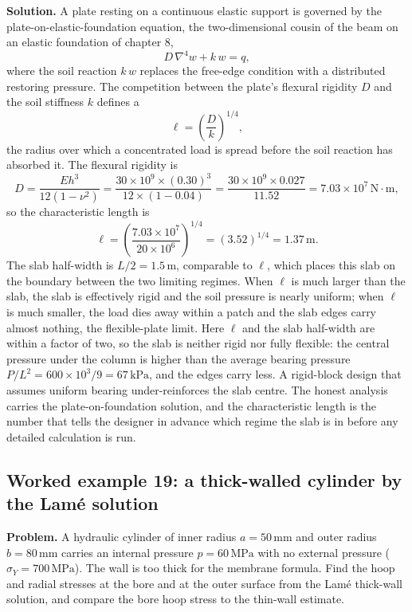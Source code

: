 \textbf{Solution.} A plate resting on a continuous elastic support is
governed by the plate-on-elastic-foundation equation, the
two-dimensional cousin of the beam on an elastic foundation of chapter 8,
\[
D\,\nabla^4 w + k\, w = q,
\]
where the soil reaction $k\,w$ replaces the free-edge condition with a
distributed restoring pressure. The competition between the plate's
flexural rigidity $D$ and the soil stiffness $k$ defines a
\[
\ell = \left(\frac{D}{k}\right)^{1/4},
\]
the radius over which a concentrated load is spread before the soil
reaction has absorbed it. The flexural rigidity is
\[
D = \frac{E h^3}{12(1-\nu^2)}
= \frac{30\times 10^9 \times (0.30)^3}{12\times (1-0.04)}
= \frac{30\times 10^9 \times 0.027}{11.52}
= 7.03\times 10^{7}\,\text{N}\cdot\text{m},
\]
so the characteristic length is
\[
\ell = \left(\frac{7.03\times 10^7}{20\times 10^6}\right)^{1/4}
= (3.52)^{1/4} = 1.37\,\si{\meter}.
\]
The slab half-width is $L/2 = 1.5\,\si{\meter}$, comparable to $\ell$,
which places this slab on the boundary between the two limiting regimes.
When $\ell$ is much larger than the slab, the slab is effectively rigid
and the soil pressure is nearly uniform; when $\ell$ is much smaller, the
load dies away within a patch and the slab edges carry almost nothing, the
flexible-plate limit. Here $\ell$ and the slab half-width are within a
factor of two, so the slab is neither rigid nor fully flexible: the
central pressure under the column is higher than the average bearing
pressure $P/L^2 = 600\times 10^3/9 = 67\,\text{kPa}$, and the edges carry
less. A rigid-block design that assumes uniform bearing under-reinforces
the slab centre. The honest analysis carries the plate-on-foundation
solution, and the characteristic length is the number that tells the
designer in advance which regime the slab is in before any detailed
calculation is run.

\subsection*{Worked example 19: a thick-walled cylinder by the Lam\'e solution}

\textbf{Problem.} A hydraulic cylinder of inner radius $a = 50\,\si{
\milli\meter}$ and outer radius $b = 80\,\si{\milli\meter}$ carries an
internal pressure $p = 60\,\text{MPa}$ with no external pressure
($\sigma_Y = 700\,\text{MPa}$). The wall is too thick for the membrane
formula. Find the hoop and radial stresses at the bore and at the outer
surface from the Lam\'e thick-wall solution, and compare the bore hoop
stress to the thin-wall estimate.

